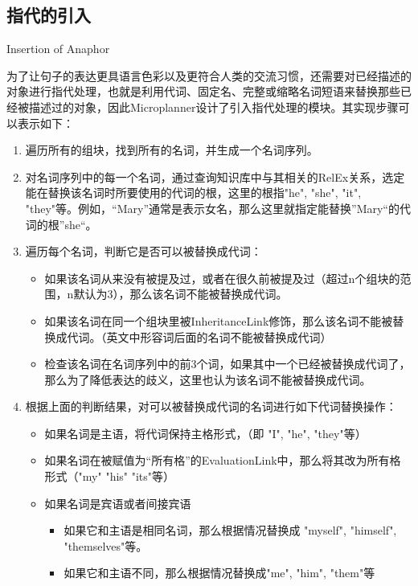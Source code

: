 \subsection{指代的引入}{Insertion of Anaphor}

为了让句子的表达更具语言色彩以及更符合人类的交流习惯，还需要对已经描述的对象进行指代处理，也就是利用代词、固定名、完整或缩略名词短语来替换那些已经被描述过的对象，因此Microplanner设计了引入指代处理的模块。其实现步骤可以表示如下：

\begin{enumerate}
\item 遍历所有的组块，找到所有的名词，并生成一个名词序列。

\item 对名词序列中的每一个名词，通过查询知识库中与其相关的RelEx关系，选定能在替换该名词时所要使用的代词的根，这里的根指"he", "she", "it", "they"等。例如，“Mary”通常是表示女名，那么这里就指定能替换”Mary“的代词的根”she“。

\item 遍历每个名词，判断它是否可以被替换成代词：

\begin{itemize}
\item 如果该名词从来没有被提及过，或者在很久前被提及过（超过n个组块的范围，n默认为3），那么该名词不能被替换成代词。
\item 如果该名词在同一个组块里被InheritanceLink修饰，那么该名词不能被替换成代词。（英文中形容词后面的名词不能被替换成代词）
\item 检查该名词在名词序列中的前3个词，如果其中一个已经被替换成代词了，那么为了降低表达的歧义，这里也认为该名词不能被替换成代词。
\end{itemize}

\item 根据上面的判断结果，对可以被替换成代词的名词进行如下代词替换操作：

\begin{itemize}
\item 如果名词是主语，将代词保持主格形式，（即 "I", "he", "they"等）
\item 如果名词在被赋值为“所有格”的EvaluationLink中，那么将其改为所有格形式（"my" "his" "its"等）
\item 如果名词是宾语或者间接宾语
\begin{itemize}
\item 如果它和主语是相同名词，那么根据情况替换成 "myself", "himself", "themselves"等。
\item 如果它和主语不同，那么根据情况替换成"me", "him", "them"等
\end{itemize}
\end{itemize}


\end{enumerate}
